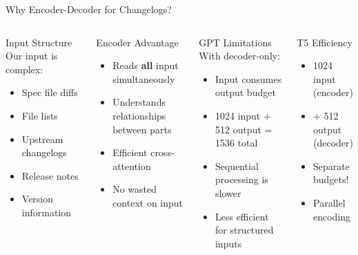 \begin{frame}{Why Encoder-Decoder for Changelogs?}
\begin{columns}
\begin{block}{Input Structure}
Our input is complex:
\begin{itemize}
  \item Spec file diffs
  \item File lists
  \item Upstream changelogs
  \item Release notes
  \item Version information
\end{itemize}
\end{block}

\begin{block}{Encoder Advantage}
\begin{itemize}
  \item Reads \textbf{all} input simultaneously
  \item Understands relationships between parts
  \item Efficient cross-attention
  \item No wasted context on input
\end{itemize}
\end{block}
\begin{block}{GPT Limitations}
With decoder-only:
\begin{itemize}
  \item Input consumes output budget
  \item 1024 input + 512 output = 1536 total
  \item Sequential processing is slower
  \item Less efficient for structured inputs
\end{itemize}
\end{block}

\begin{block}{T5 Efficiency}
\begin{itemize}
  \item 1024 input (encoder)
  \item + 512 output (decoder)
  \item Separate budgets!
  \item Parallel encoding
\end{itemize}
\end{block}
\end{columns}
\end{frame}

